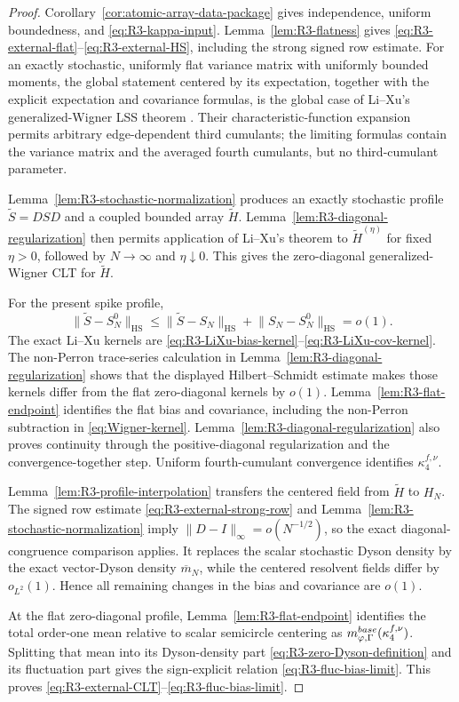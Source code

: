 \documentclass[10pt,a4paper]{amsart}
\newcommand{\HS}{\mathrm{HS}}
\newcommand{\norm}[1]{\lVert #1\rVert}
\begin{document}
\begin{proof}
Corollary~\ref{cor:atomic-array-data-package} gives independence, uniform
boundedness, and \eqref{eq:R3-kappa-input}.  Lemma~\ref{lem:R3-flatness}
gives \eqref{eq:R3-external-flat}--\eqref{eq:R3-external-HS}, including the
strong signed row estimate.  For an exactly stochastic, uniformly flat
variance matrix with uniformly bounded moments, the global statement centered
by its expectation, together with the explicit expectation and covariance
formulas, is the global case of Li--Xu's generalized-Wigner LSS theorem
\cite[Theorem~2.2]{LiXu2021GeneralizedWignerLES}.  Their
characteristic-function expansion permits arbitrary edge-dependent third
cumulants; the limiting formulas contain the variance matrix and the averaged
fourth cumulants, but no third-cumulant parameter.

Lemma~\ref{lem:R3-stochastic-normalization} produces an exactly stochastic
profile \(\widetilde S=DSD\) and a coupled bounded array \(\widetilde H\).
Lemma~\ref{lem:R3-diagonal-regularization} then permits application of
Li--Xu's theorem to \(\widetilde H^{(\eta)}\) for fixed \(\eta>0\), followed by
\(N\to\infty\) and \(\eta\downarrow0\).  This gives the zero-diagonal
generalized-Wigner CLT for \(\widetilde H\).

For the present spike profile,
\[
 \norm{\widetilde S-S_N^0}_{\HS}
 \le\norm{\widetilde S-S_N}_{\HS}
   +\norm{S_N-S_N^0}_{\HS}=o(1).
\]
The exact Li--Xu kernels are
\eqref{eq:R3-LiXu-bias-kernel}--\eqref{eq:R3-LiXu-cov-kernel}.  The
non-Perron trace-series calculation in
Lemma~\ref{lem:R3-diagonal-regularization} shows that the displayed
Hilbert--Schmidt estimate makes those kernels differ from the flat
zero-diagonal kernels by \(o(1)\).  Lemma~\ref{lem:R3-flat-endpoint} identifies
the flat bias and covariance, including the non-Perron subtraction in
\eqref{eq:Wigner-kernel}.  Lemma~\ref{lem:R3-diagonal-regularization} also
proves continuity through the positive-diagonal regularization and the
convergence-together step.  Uniform fourth-cumulant convergence identifies
\(\kappa_4^{f,\nu}\).

Lemma~\ref{lem:R3-profile-interpolation} transfers the centered field from
\(\widetilde H\) to \(H_N\).  The signed row estimate
\eqref{eq:R3-external-strong-row} and
Lemma~\ref{lem:R3-stochastic-normalization} imply
\(\lVert D-I\rVert_\infty=o(N^{-1/2})\), so the exact diagonal-congruence
comparison applies.  It replaces the scalar stochastic Dyson density by the
exact vector-Dyson density \(\overline m_N\), while the centered resolvent
fields differ by \(o_{L^2}(1)\).  Hence all remaining changes in the bias and
covariance are \(o(1)\).

At the flat zero-diagonal profile, Lemma~\ref{lem:R3-flat-endpoint} identifies
the total order-one mean relative to scalar semicircle centering as
\(m_{\varphi,\Gamma}^{\rm base}(\kappa_4^{f,\nu})\).  Splitting that mean into its
Dyson-density part \eqref{eq:R3-zero-Dyson-definition} and its fluctuation
part gives the sign-explicit relation \eqref{eq:R3-fluc-bias-limit}.  This
proves \eqref{eq:R3-external-CLT}--\eqref{eq:R3-fluc-bias-limit}.
\end{proof}
\end{document}
